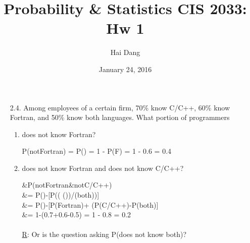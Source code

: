 \documentclass[fleqn]{article}
\begin{document}
\title{Probability \& Statistics CIS 2033: Hw 1}
\date{January 24, 2016}
\author{Hai Dang}

\maketitle

\begin{enumerate}
	\item[2.4.]
 	Among employees of a certain firm, 70\% know C/C++, 60\% know Fortran, and 50\% know
	both languages. What portion of programmers
	\begin{comment}	
		\\
		\begin{flalign*}
 		Let\;F:=\;know\;Fortran,\;C:=\;know\;C/C+\!+,\;and\;B :=\;know\;both
 		\end{flalign*}
 	\end{comment}
 	\begin{enumerate}
 		\item %
 			does not know Fortran?
 			\begin{flalign*}
 			P(not\;Fortran) = P() = 1 - P(F) = 1 - 0.6 = 0.4
 			\end{flalign*}
 		\item %
 			does not know Fortran and does not know C/C++?
 			\begin{flalign*}
 			&P(not\;Fortran\;\&\;not\;C/C+\!+) \\
 			&= P(\Omega)-[P(( \cup ())/(both))] \\
 			&= P(\Omega)-[P(Fortran)+ (P(C/C+\!+)-P(both)] \\
 			&= 1-(0.7+0.6-0.5) = 1 - 0.8 = 0.2
 			\end{flalign*}	
 			
		\paragraph{}
		\underline R: Or is the question asking P(does not know both)? 	
 			
 			\begin{comment}
 			\begin{flalign*}
 			P(not\;Fortran\;\&\;not\;C/C+\!+) = P(\overline{both}) = 1 - 0.5 = 0.5
 			\end{flalign*}	
 			\end{comment}	
 			

\end{enumerate}
\end{enumerate}
\end{document}
